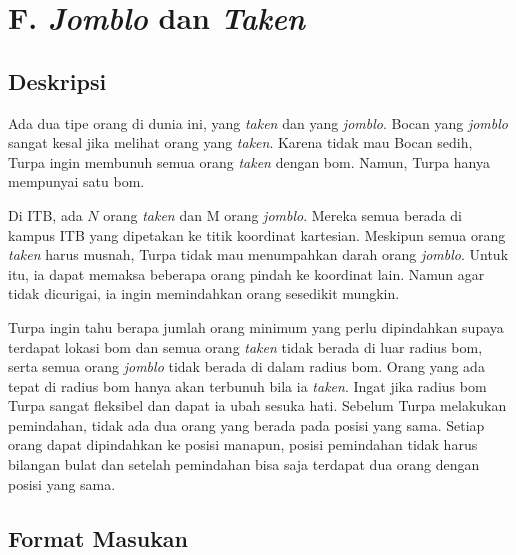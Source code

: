 \documentclass{article}
\begin{document}
\section*{\hfil F. \textit{Jomblo} dan \textit{Taken}\hfil}


\subsection*{Deskripsi}

\par\noindent Ada dua tipe orang di dunia ini, yang \textit{taken} dan yang \textit{jomblo}. Bocan yang \textit{jomblo} sangat kesal jika melihat orang yang \textit{taken}. Karena tidak mau Bocan sedih, Turpa ingin membunuh semua orang \textit{taken} dengan bom. Namun, Turpa hanya mempunyai satu bom.

\par\noindent Di ITB, ada $N$ orang \textit{taken} dan M orang \textit{jomblo}. Mereka semua berada di kampus ITB yang dipetakan ke titik koordinat kartesian. Meskipun semua orang \textit{taken} harus musnah, Turpa tidak mau menumpahkan darah orang \textit{jomblo}. Untuk itu, ia dapat memaksa beberapa orang pindah ke koordinat lain. Namun agar tidak dicurigai, ia ingin memindahkan orang sesedikit mungkin.

\par\noindent Turpa ingin tahu berapa jumlah orang minimum yang perlu dipindahkan supaya terdapat lokasi bom dan semua orang \textit{taken} tidak berada di luar radius bom, serta semua orang \textit{jomblo} tidak berada di dalam radius bom. Orang yang ada tepat di radius bom hanya akan terbunuh bila ia \textit{taken}. Ingat jika radius bom Turpa sangat fleksibel dan dapat ia ubah sesuka hati. Sebelum Turpa melakukan pemindahan, tidak ada dua orang yang berada pada posisi yang
sama. Setiap orang dapat dipindahkan ke posisi manapun, posisi pemindahan tidak harus bilangan bulat dan setelah pemindahan bisa saja terdapat dua orang dengan posisi yang sama.

\subsection*{Format Masukan}
\end{document}
